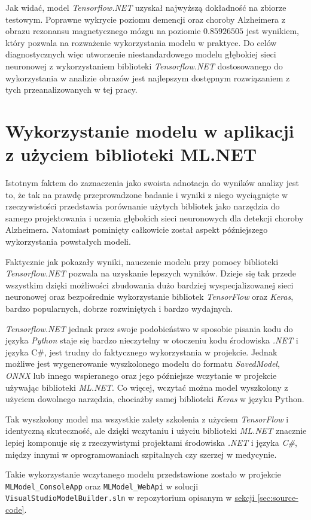 Jak widać, model \emph{Tensorflow.NET} uzyskał najwyższą dokładność na zbiorze testowym.
Poprawne wykrycie poziomu demencji oraz choroby Alzheimera z obrazu rezonansu magnetycznego mózgu na poziomie $0.85926505$ jest wynikiem, który pozwala na rozważenie wykorzystania modelu w praktyce.
Do celów diagnostycznych więc utworzenie niestandardowego modelu głębokiej sieci neuronowej z wykorzystaniem biblioteki \emph{Tensorflow.NET} dostosowanego do wykorzystania w analizie obrazów jest najlepszym dostępnym rozwiązaniem z tych przeanalizowanych w tej pracy.

\section{Wykorzystanie modelu w aplikacji z użyciem biblioteki ML.NET}

Istotnym faktem do zaznaczenia jako swoista adnotacja do wyników analizy jest to, że tak na prawdę przeprowadzone badanie i wyniki z niego wyciągnięte w rzeczywistości przedstawia porównanie użytych bibliotek jako narzędzia do samego projektowania i uczenia głębokich sieci neuronowych dla detekcji choroby Alzheimera.
Natomiast pominięty całkowicie został aspekt późniejszego wykorzystania powstałych modeli.

Faktycznie jak pokazały wyniki, nauczenie modelu przy pomocy biblioteki \emph{Tensorflow.NET} pozwala na uzyskanie lepszych wyników.
Dzieje się tak przede wszystkim dzięki możliwości zbudowania dużo bardziej wyspecjalizowanej sieci neuronowej oraz bezpośrednie wykorzystanie bibliotek \emph{TensorFlow} oraz \emph{Keras}, bardzo popularnych, dobrze rozwiniętych i bardzo wydajnych.

\emph{Tensorflow.NET} jednak przez swoje podobieństwo w sposobie pisania kodu do języka \emph{Python} staje się bardzo nieczytelny w otoczeniu kodu środowiska \emph{.NET} i języka C\#, jest trudny do faktycznego wykorzystania w projekcie.
Jednak możliwe jest wygenerowanie wyszkolonego modelu do formatu \emph{SavedModel}, \emph{ONNX} lub innego wspieranego oraz jego późniejsze wczytanie w projekcie używając biblioteki \emph{ML.NET}.
Co więcej, wczytać można model wyszkolony z użyciem dowolnego narzędzia, chociażby samej biblioteki \emph{Keras} w języku Python.

Tak wyszkolony model ma wszystkie zalety szkolenia z użyciem \emph{TensorFlow} i identyczną skuteczność, ale dzięki wczytaniu i użyciu biblioteki \emph{ML.NET} znacznie lepiej komponuje się z rzeczywistymi projektami środowiska \emph{.NET} i języka \emph{C\#}, między innymi w oprogramowaniach szpitalnych czy szerzej w medycynie.

Takie wykorzystanie wczytanego modelu przedstawione zostało w projekcie \lstinline{MLModel_ConsoleApp} oraz \lstinline{MLModel_WebApi} w solucji \lstinline{VisualStudioModelBuilder.sln} w repozytorium opisanym w \hyperref[sec:source-code]{sekcji \ref*{sec:source-code}}.
